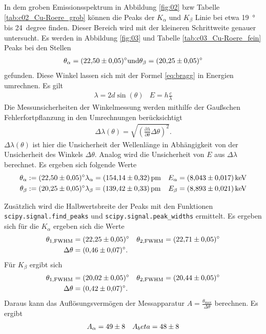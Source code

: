 In dem groben Emissionsspektrum in Abbildung \ref{fig:02} bzw Tabelle \ref{tab:c02_Cu-Roere_grob} können die
Peaks der $K_\alpha$ und $K_\beta$ Linie bei etwa \qty{19}{\degree} bis
\qty{24}{degree} finden.
Dieser Bereich wird mit der kleineren Schrittweite genauer untersucht.
Es werden in Abbildung \ref{fig:03} und Tabelle \ref{tab:c03_Cu-Roere_fein} Peaks bei den Stellen 
\begin{align}
    \theta_\alpha = \qty{22.50 \pm 0.05}{\degree} \text{und}
    \theta_\beta = \qty{ 20.25 \pm 0.05}{\degree}
\end{align}
gefunden.
Diese Winkel lassen sich mit der Formel \eqref{eq:bragg} in Energien umrechnen.
Es gilt
\begin{align*}
    \lambda = 2 d \sin(\theta) & E = h \frac{c}{\lambda}
\end{align*}
Die Messunsicherheiten der Winkelmessung werden mithilfe der Gaußschen Fehlerfortpflanzung in den Umrechnungen berücksichtigt
\begin{align}
    \Delta \lambda(\theta) = \sqrt{
    \left(\frac{\partial \lambda}{\partial \theta} \Delta \theta \right)^2 }.
    \label{eq:gauss}
\end{align}
$\Delta \lambda(\theta)$ ist hier die Unsicherheit der Wellenlänge in Abhängigkeit von der Unsicherheit des Winkels $\Delta \theta$.
Analog wird die Unsicherheit von $E$ aus $\Delta \lambda$ berechnet.
Es ergeben sich folgende Werte 
\begin{align*}
    \theta_\alpha: = \qty{22.50 \pm 0.05}{\degree} & \lambda_\alpha = \qty{154.14 \pm 0.32}{\pico\meter}  & E_\alpha = \qty{8.043 \pm 0.017}{\kilo\eV}  \\
    \theta_\beta:  = \qty{20.25 \pm 0.05}{\degree} & \lambda_\beta  = \qty{139.42 \pm 0.33}{\pico\meter}  & E_\beta  = \qty{8.893 \pm 0.021}{\kilo\eV}   
\end{align*}

Zusätzlich wird die Halbwertsbreite der Peaks mit den Funktionen \texttt{scipy.signal.find\_peaks}  und \texttt{scipy.signal.peak\_widths} ermittelt.
Es ergeben sich für die $K_\alpha$ ergeben sich die Werte
\begin{align*}
    \theta_{1,\text{FWHM}} &= \qty{22.25 \pm 0.05}{\degree} & \theta_{2,\text{FWHM}} = \qty{22.71 \pm 0.05}{\degree} \\
    \Delta \theta &= \qty{0.46 \pm 0.07}{\degree}.
\end{align*}
Für $K_\beta$ ergibt sich
\begin{align*}
    \theta_{1,\text{FWHM}} &= \qty{20.02 \pm 0.05}{\degree} & \theta_{2,\text{FWHM}} = \qty{20.44 \pm 0.05}{\degree} \\
    \Delta \theta &= \qty{0.42 \pm 0.07}{\degree}.
\end{align*}
Daraus kann das Auflösungsvermögen der Messapparatur $A= \frac{\theta_\text{max}}{\Delta \theta}$ berechnen.
Es ergibt
\begin{align*}
    A_\alpha &= \num{49 \pm 8} & A_beta = \num{48 \pm 8}
\end{align*}

